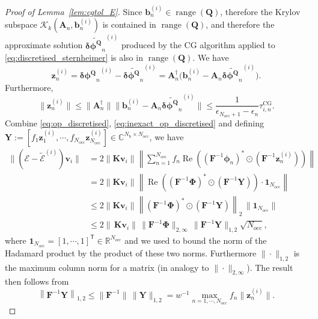 \documentclass[hidelinks,onefignum,onetabnum]{siamart250211}
\newcommand{\R}{\mathbb{R}}
\newcommand{\C}{\mathbb{C}}
\newcommand{\Real}{\operatorname{Re}}
\newcommand{\range}{\operatorname{range}}
\newcommand{\Nocc}{N_{\mathrm{occ}}}
\newcommand{\Nb}{N_{\mathrm{b}}}
\newcommand{\taucg}{\tau^{\mathrm{CG}}}
\begin{document}
\begin{proof}[Proof of Lemma~\ref{lem:cgtol_E}]
    Since $\bm b_n^{(i)} \in \range(\bm Q)$, therefore the Krylov subspace $\mathcal{K}_k(\bm A_n, \bm b_n^{(i)})$ is contained in $\range(\bm Q)$, and therefore the approximate solution $\widetilde{\bm{\delta \phi^Q}_n}^{(i)}$ produced by the CG algorithm
applied to \eqref{eq:discretised_sternheimer} is also in $\range(\bm Q)$. We have
    \begin{equation}
          \bm{z}_{n}^{(i)} = {\bm{\delta \phi^Q}_n}^{(i)} - \widetilde{\bm{\delta \phi^Q}_n}^{(i)}  = \bm A_n^{\dagger} \Big(\bm b_n^{(i)} - \bm A_n \widetilde{\bm{\delta \phi^Q}_n}^{(i)}\Big).
    \end{equation}
    Furthermore,
    \begin{equation}\label{eq:z_bound}
        \| \bm{z}_{n}^{(i)} \| \leq \| \bm A_n^{\dagger} \| \| \bm b_n^{(i)} - \bm A_n \widetilde{\bm{\delta \phi^Q}_n}^{(i)} \| \leq \dfrac{1}{\epsilon_{\Nocc+1} - \epsilon_n} \taucg_{i,n}.
    \end{equation}
    Combine \eqref{eq:op_discretised}, \eqref{eq:inexact_op_discretised} and
    defining $\bm Y := [ f_1 \bm z_1^{(i)}, \cdots, f_{\Nocc} \bm z_{\Nocc}^{(i)} ] \in
    \C^{\Nb \times \Nocc}$, we have
    \begin{equation}\label{eq:dielectricdiff}
      \begin{aligned}
          \| (\bm{\mathcal E} - \widetilde{\bm{\mathcal E}}^{(i)}) \bm{v}_i\| &= 2 \left\| \bm K \bm{v}_i\right\| \left\| \sum_{n=1}^{\Nocc} f_n \Real \left( \left(\bm F^{-1} \bm{\phi}_n\right)^* \odot \left( \bm F^{-1} \bm{z}_n^{(i)} \right) \right) \right\|                                                             \\
          & = 2 \left\| \bm K \bm{v}_i\right\| \left\| \Real\left((\bm{F}^{-1}\bm{\Phi})^* \odot (\bm{F}^{-1}\bm{Y})\right) \cdot \bm{1}_{\Nocc} \right\| \\
          & \leq 2 \left\| \bm K \bm{v}_i\right\| \left\| (\bm{F}^{-1}\bm{\Phi})^* \odot (\bm{F}^{-1}\bm{Y}) \right\|_{2} \, \|\bm{1}_{\Nocc}\| \\
          & \leq 2 \left\| \, \bm K \bm{v}_i\right\| \, \|\bm{F}^{-1}\bm{\Phi}\|_{2,\infty} \, \|\bm{F}^{-1}\bm{Y}\|_{1,2} \sqrt{\Nocc},
      \end{aligned}
\end{equation}
where $\bm{1}_{\Nocc} = [1, \cdots, 1]^\mathsf{T} \in \R^{\Nocc}$
and we used \cite[Theorem 5.5.3]{roger1991topics}
to bound the norm of the Hadamard product by the product of these two norms.
Furthermore $\|\cdot\|_{1,2}$ is the maximum column norm for a matrix
(in analogy to $\|\cdot\|_{2,\infty}$).
The result then follows from
\begin{equation}
    \left\|\bm{F}^{-1}\bm{Y}\right\|_{1,2}
    \leq \|\bm{F}^{-1}\| \, \|\bm Y\|_{1,2}
    = w^{-1} \max_{n=1,\cdots,\Nocc} f_n \| \bm{z}_n^{(i)} \|.
\end{equation}
\end{proof}
\end{document}
